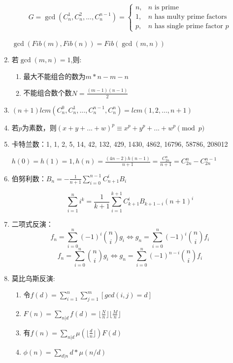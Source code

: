 \documentclass[twoside]{article}
\begin{document}
\begin{enumerate}
$$
G=\gcd(C_n^1,C_n^2,...,C_n^{n-1})=
\begin{cases}
	n, & \text{$n$ is prime} \\
	1, & \text{$n$ has multy prime factors} \\
	p, & \text{$n$ has single prime factor $p$}
\end{cases}
$$

$\gcd(Fib(m),Fib(n))=Fib(\gcd(m,n))$

\item 若$\gcd(m,n)=1$,则:

\begin{enumerate}
\item 最大不能组合的数为$m*n-m-n$
\item 不能组合数个数$N=\frac{(m-1)(n-1)}{2}$
\end{enumerate}

\item $(n+1)lcm(C_n^0,C_n^1,...,C_n^{n-1},C_n^{n})=lcm(1,2,...,n+1)$

\item 若$p$为素数，则$(x+y+...+w)^p\equiv x^p+y^p+...+w^p\pmod p$

\item 卡特兰数：1, 1, 2, 5, 14, 42, 132, 429, 1430, 4862, 16796, 58786, 208012

$h(0)=h(1)=1,h(n)=\frac{(4n-2)h(n-1)}{n+1}=\frac{C_{2n}^n}{n+1}=C_{2n}^n-C_{2n}^{n-1}$

\item 伯努利数：$B_n = -\frac{1}{n+1} \sum_{i=0}^{n-1} C_{n+1}^i B_i$

$$\sum_{i=1}^n i^k = \frac{1}{k+1} \sum_{i=1}^{k+1}C_{k+1}^i B_{k+1-i}(n+1)^i$$

\item 二项式反演：$$f_n = \sum_{i = 0} ^ n (-1) ^ i \binom{n}{i} g_i \Leftrightarrow g_n = \sum_{i = 0} ^ n (-1) ^ i \binom{n}{i} f_i$$
$$f_n = \sum_{i = 0} ^ n \binom{n}{i} g_i \Leftrightarrow g_n = \sum_{i = 0} ^ n (-1) ^ {n - i} \binom{n}{i} f_i$$

\item 莫比乌斯反演:
\begin{enumerate}
\item 令$f(d)=\sum_{i=1}^{n}\sum_{j=1}^{m}[gcd(i,j)=d]$
\item $F(n)=\sum_{n|d}f(d)=\lfloor\frac{N}{n}\rfloor\lfloor\frac{M}{n}\rfloor$
\item 有$f(n)=\sum_{n|d}\mu(\lfloor\frac{d}{n}\rfloor)F(d)$
\item $\phi(n)=\sum_{d|n}d*\mu(n/d)$
\end{enumerate}



\end{enumerate}
\end{document}
